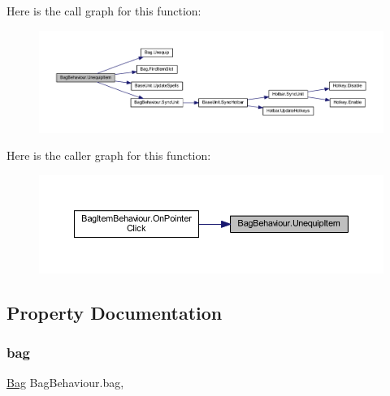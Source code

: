 Here is the call graph for this function\+:
\nopagebreak
\begin{figure}[H]
\begin{center}
\leavevmode
\includegraphics[width=350pt]{class_bag_behaviour_a61062b91187139c43e2681c220111433_cgraph}
\end{center}
\end{figure}
Here is the caller graph for this function\+:
\nopagebreak
\begin{figure}[H]
\begin{center}
\leavevmode
\includegraphics[width=350pt]{class_bag_behaviour_a61062b91187139c43e2681c220111433_icgraph}
\end{center}
\end{figure}


\subsection{Property Documentation}
\mbox{\label{class_bag_behaviour_a2ce7c6b9e26738b42f953a3351b8b1b4}} 
\subsubsection{\texorpdfstring{bag}{bag}}
{\footnotesize\ttfamily \mbox{\hyperlink{class_bag}{Bag}} Bag\+Behaviour.\+bag\hspace{0.3cm}{\ttfamily [get]}, {\ttfamily [set]}}

\mbox{\label{class_bag_behaviour_a902e05fcee6312ba24825f3d9f785b8b}} 
